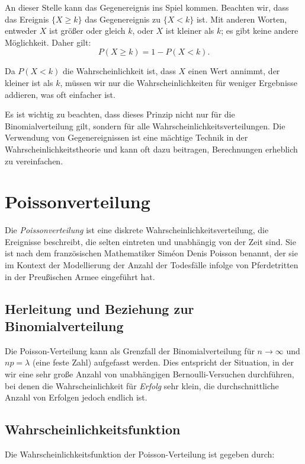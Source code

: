 An dieser Stelle kann das Gegenereignis ins Spiel kommen.
Beachten wir, dass das Ereignis $\{X \geq k\}$ das Gegenereignis zu $\{X < k\}$ ist.
Mit anderen Worten, entweder $X$ ist größer oder gleich $k$, oder $X$ ist kleiner als $k$; es gibt keine andere Möglichkeit.
Daher gilt:
\[
    P(X \geq k) = 1 - P(X < k).
\]

Da $P(X < k)$ die Wahrscheinlichkeit ist, dass $X$ einen Wert annimmt, der kleiner ist als $k$, müssen wir nur die Wahrscheinlichkeiten für weniger Ergebnisse addieren, was oft einfacher ist.

Es ist wichtig zu beachten, dass dieses Prinzip nicht nur für die Binomialverteilung gilt, sondern für alle Wahrscheinlichkeitsverteilungen.
Die Verwendung von Gegenereignissen ist eine mächtige Technik in der Wahrscheinlichkeitstheorie und kann oft dazu beitragen, Berechnungen erheblich zu vereinfachen.

\section{Poissonverteilung}

Die \textit{Poissonverteilung} ist eine diskrete Wahrscheinlichkeitsverteilung, die Ereignisse beschreibt, die selten eintreten und unabhängig von der Zeit sind.
Sie ist nach dem französischen Mathematiker Siméon Denis Poisson benannt, der sie im Kontext der Modellierung der Anzahl der Todesfälle infolge von Pferdetritten in der Preußischen Armee eingeführt hat.

\subsection{Herleitung und Beziehung zur Binomialverteilung}

Die Poisson-Verteilung kann als Grenzfall der Binomialverteilung für $n \rightarrow \infty$ und $np = \lambda$ (eine feste Zahl) aufgefasst werden.
Dies entspricht der Situation, in der wir eine sehr große Anzahl von unabhängigen Bernoulli-Versuchen durchführen, bei denen die Wahrscheinlichkeit für \textit{Erfolg} sehr klein, die durchschnittliche Anzahl von Erfolgen jedoch endlich ist.

\subsection{Wahrscheinlichkeitsfunktion}

Die Wahrscheinlichkeitsfunktion der Poisson-Verteilung ist gegeben durch:


